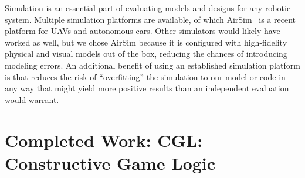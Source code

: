 \documentclass[12pt]{cmuthesis}
\theoremstyle{definition}
\theoremstyle{remark}
\newcommand{\CGL}{\textsf{CGL}\xspace}
\begin{document}
Simulation is an essential part of evaluating models and designs for any robotic system.
Multiple simulation platforms are available, of which AirSim~\cite{shah2018airsim} is a recent platform for UAVs and autonomous cars.
Other simulators would likely have worked as well, but we chose AirSim because it is configured with high-fidelity physical and visual models out of the box, reducing the chances of introducing modeling errors.
An additional benefit of using an established simulation platform is that reduces the risk of ``overfitting'' the simulation to our model or code in any way that might yield more positive results than an independent evaluation would warrant.

\chapter{Completed Work: \CGL: Constructive Game Logic}
\label{ch:cgl}
\newcommand{\projUp}[2]{{#1}\uparrow{#2}}
\newcommand{\projDown}[3]{{#1}\downarrow{#2(#3)}}
\newcommand{\projBV}[3]{\projDown{#1}{#2}{\boundvars{#3}^\complement}}
\newcommand{\sapp}[2]{#1(#2)}
\newcommand{\sadj}[2]{#1^*(#2)}
\newcommand{\spp}[1]{\sapp{\sigma}{#1}}
\newcommand{\adj}[1]{\sadj{\sigma}{#1}}
\newcommand{\drv}{\mathcal{D}}
\newcommand{\nzvar}{\textit{nz}}
\newcommand{\convvar}{\textit{cnv}}
\newcommand{\erefl}{\textsf{refl}}
\newcommand{\pstep}{\textsf{step}}
\newcommand{\modvar}{\textit{mod}}
\newcommand{\monvar}{\textsf{m}
}
\newcommand{\rangevar}{\textsf{Range}}
\newcommand{\testvar}{\textsf{test}}
\newcommand{\elem}[2]{\textsf{Dec}[#1](#2)}
\newcommand{\spc}{\hspace{0.15in}}
\newcommand{\kwmod}{\textsf{mod}}
\newcommand{\emod}[2]{#1~\kwmod~#2}
\newcommand{\kwdiv}{\textsf{div}}
\newcommand{\ediv}[2]{#1~\kwdiv~#2}
\newcommand{\kwsig}{\Sigma}
\newcommand{\sig}[1]{\kwsig(#1)}
\newcommand{\nim}{\textsc{Nim}}
\newcommand{\cake}{\textsc{CC}}
\newcommand{\interp}{I}
\newcommand{\valset}[1]{\mathfrak{V}(#1)}
\newcommand{\kwbool}{\m{\mathbb{B}}}
\newcommand{\kwint}{\m{\mathbb{Z}}}
\newcommand{\kwreal}{\m{\mathbb{R}}}
\newcommand{\kwintsig}{\Xi}
\newcommand{\intsig}[1]{\kwintsig(#1)}
\newcommand{\churchkleene}{\omega_{\text{CK}}}
\newcommand{\restL}[1]{#1_L}
\newcommand{\restR}[1]{#1_R}
\newcommand{\apL}[1]{#1_{\langle{0}\rangle}}
\newcommand{\apR}[1]{#1_{\langle{1}\rangle}}
\newcommand{\dpL}[1]{#1_{[0]}}
\newcommand{\dpR}[1]{#1_{[1]}}

\newcommand{\va}{a}
\newcommand{\vb}{b}
\newcommand{\vca}{\overline{a}}
\newcommand{\vcb}{\overline{b}}
\end{document}
